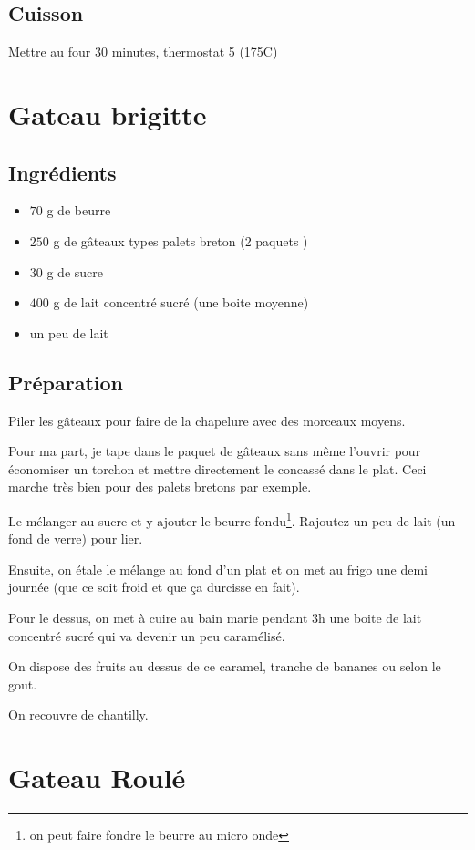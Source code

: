 \subsection*{Cuisson}
Mettre au four 30 minutes, thermostat 5 (175\degres C)


\newpage
\section{Gateau brigitte}
\subsection*{Ingrédients}
\begin{itemize}
\item $70$ g de beurre
\item $250$ g de gâteaux types palets breton (2 paquets )
\item $30$ g de sucre
\item $400$ g de lait concentré sucré (une boite moyenne)
\item un peu de lait
\end{itemize}

\subsection*{Préparation}
Piler les gâteaux pour faire de la chapelure avec des morceaux moyens.

\begin{remarque}
Pour ma part, je tape dans le paquet de gâteaux sans même l'ouvrir pour économiser un torchon et mettre directement le concassé dans le plat. Ceci marche très bien pour des palets bretons par exemple.
\end{remarque}

Le mélanger au sucre et y ajouter le beurre fondu\footnote{on peut faire fondre le beurre au micro onde}. Rajoutez un peu de lait (un fond de verre) pour lier.

Ensuite, on étale le mélange au fond d'un plat et on met au frigo une demi journée (que ce soit froid et que ça durcisse en fait).

Pour le dessus, on met à cuire au bain marie pendant 3h une boite de lait concentré sucré qui va devenir un peu caramélisé.

On dispose des fruits au dessus de ce caramel, tranche de bananes ou selon le gout.

On recouvre de chantilly.

\newpage
\section{Gateau Roulé}
